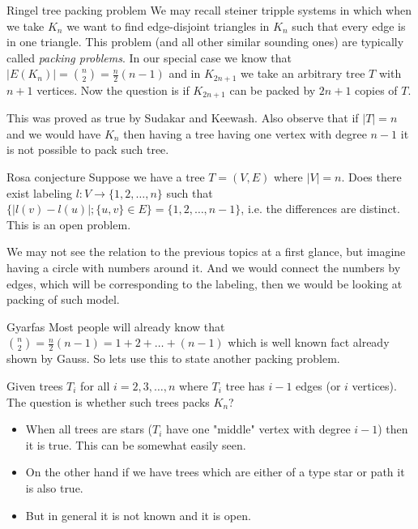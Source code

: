 \begin{topic}{Ringel tree packing problem}
	We may recall steiner tripple systems in which when we take $K_n$ we want to find edge-disjoint triangles in $K_n$ such that every edge is in one triangle. This problem (and all other similar sounding ones) are typically called \textit{packing problems}. In our special case we know that $|E(K_n)| = \binom{n}{2} = \frac{n}{2} (n-1)$ and in $K_{2n+1}$ we take an arbitrary tree $T$ with $n+1$ vertices. Now the question is if $K_{2n+1}$ can be packed by $2n+1$ copies of $T$.
	
	This was proved as true by Sudakar and Keewash. Also observe that if $|T| = n$ and we would have $K_n$ then having a tree having one vertex with degree $n-1$ it is not possible to pack such tree.
\end{topic}

\begin{topic}{Rosa conjecture}
	Suppose we have a tree $T = (V,E)$ where $|V| = n$. Does there exist labeling $l : V \to \{1,2, \dots, n\}$ such that $\{|l(v) - l(u)|; \{u,v\} \in E\} = \{1,2, \dots, n-1\}$, i.e. the differences are distinct. This is an \OPEN open problem.
	
	We may not see the relation to the previous topics at a first glance, but imagine having a circle with numbers around it. And we would connect the numbers by edges, which will be corresponding to the labeling, then we would be looking at packing of such model.
\end{topic}

\begin{topic}{Gyarfas}
	Most people will already know that $\binom{n}{2} = \frac{n}{2} (n-1) = 1 + 2 + \dots + (n-1)$ which is well known fact already shown by Gauss. So lets use this to state another packing problem.
	
	Given trees $T_i$ for all $i = 2,3, \dots, n$ where $T_i$ tree has $i-1$ edges (or $i$ vertices). The question is whether such trees packs $K_n$?
	
	\begin{itemize}
		\item When all trees are stars ($T_i$ have one "middle" vertex with degree $i-1$) then it is true. This can be somewhat easily seen.
		\item On the other hand if we have trees which are either of a type star or path it is also true.
		\item But in general it is not known and it is \OPEN open.
	\end{itemize}
\end{topic}

